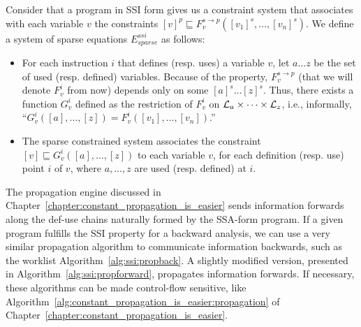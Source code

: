 {%
\begin{definition}
\label{def:ssi_eq}
Consider that a program in SSI form gives us a constraint system that 
associates with each variable $v$ the constraints $[v]^p \sqsubseteq  F_v^{s\to 
p}([v_1]^s, \dots, [v_n]^s)$. We define a system of sparse equations 
$E^{\textit{ssi}}_{\textit{sparse}}$ as follows:

\begin{itemize}

\item For each instruction $i$ that defines (resp. uses) a variable $v$, let $a 
  \dots z$ be the set of used (resp. defined) variables. Because of the \plink 
  property, $F^{s\to p}_v$ (that we will denote $F^i_v$ from now) depends only 
  on some $[a]^s \dots [z]^s$.
Thus, there exists a function $G^i_v$ defined as the restriction of $F^i_v$ on 
${\cal L}_a\times \dots \times{\cal L}_z$, i.e., informally, ``$G^i_v([a], 
\dots, [z]) = F^i_v([v_1],\dots, [v_n])$.''
\item The sparse constrained system associates the constraint $[v]  \sqsubseteq 
  G_v^i([a], \ldots, [z])$ to each variable $v$, for each definition (resp.  
  use) point $i$ of $v$, where $a,\dots, z$ are used (resp.  defined) at $i$.
\end{itemize}

\end{definition}

The propagation engine discussed in 
Chapter~\ref{chapter:constant_propagation_is_easier} sends information forwards 
along the def-use chains naturally formed by the SSA-form program.
If a given program fulfills the SSI property for a backward 
analysis, we can use a very similar propagation 
algorithm to communicate information backwards, such as the worklist 
Algorithm~\ref{alg:ssi:propback}.
A slightly modified version, presented in Algorithm~\ref{alg:ssi:propforward},
propagates information forwards.
If necessary, these algorithms can be made control-flow sensitive, like 
Algorithm~\ref{alg:constant_propagation_is_easier:propagation} of 
Chapter~\ref{chapter:constant_propagation_is_easier}.

\def\defall{
  \def\1{\qquad}
  \def\2{\1\1}
  \def\3{\2\1}
  \def\4{\2\2}
  \def\5{\3\2}
  \def\6{\4\2}
  \def\7{\5\2}
  \def\8{\6\2}
  \def\9{\7\2}
  \def\If{{\sf  if }}
  \def\Let{{\sf  let }}
  \def\Then{{\sf  then }}
  \def\Else{{\sf  else}}
  \def\Foreach{{\sf foreach }}
  \def\For{{\sf for }}
  \def\While{{\sf while }}
}


}
